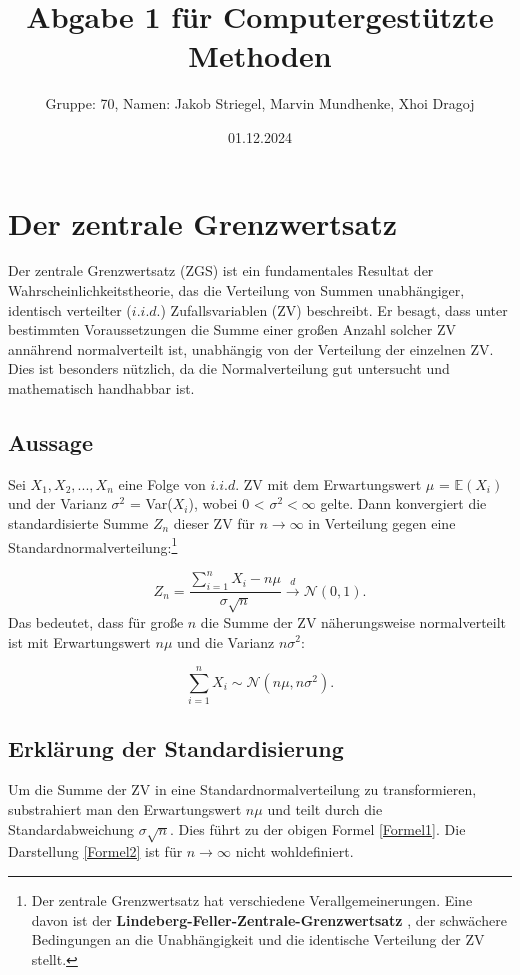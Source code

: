 \documentclass{article}
\title{Abgabe 1 für Computergestützte Methoden}
\author{Gruppe: 70, Namen: Jakob Striegel, Marvin Mundhenke, Xhoi Dragoj}
\date{01.12.2024}
\begin{document}
\maketitle
\tableofcontents
\newpage
\section{Der zentrale Grenzwertsatz}
Der zentrale Grenzwertsatz (ZGS) ist ein fundamentales Resultat der Wahrscheinlichkeitstheorie, das die Verteilung von Summen unabhängiger, identisch verteilter ($i.i.d.$) Zufallsvariablen (ZV) beschreibt. Er besagt, dass unter bestimmten Voraussetzungen die Summe einer großen Anzahl solcher ZV annährend normalverteilt ist, unabhängig von der Verteilung der einzelnen ZV. Dies ist besonders nützlich, da die Normalverteilung gut untersucht und mathematisch handhabbar ist.



\subsection{Aussage}
Sei $ X_{1} ,X_{2},..., X_{n} $ eine Folge von $i.i.d.$ ZV mit dem Erwartungswert $\mu$  = $\mathbb{E}(X_{i})$ 
und der Varianz $\sigma^2$ = Var($X_{i}$), wobei  0 < $\sigma^2 < \infty$ gelte. Dann konvergiert
die standardisierte Summe $Z_{n}$  dieser ZV für $n \to  \infty$  in Verteilung gegen eine
Standardnormalverteilung:\footnote[1]{Der zentrale Grenzwertsatz hat verschiedene Verallgemeinerungen. Eine davon ist der \textbf{Lindeberg-Feller-Zentrale-Grenzwertsatz} \citep[Seite 328]{klenke}, der schwächere Bedingungen an die Unabhängigkeit und die identische Verteilung der ZV stellt.}

\begin{equation}
    \label{Formel1}
    Z_{n}= \frac{\sum_{i=1}^{n} X_{i}-n\mu}{\sigma \sqrt{n}} \overset{d}{\to} \mathcal{N}(0,1).
\end{equation}
Das bedeutet, dass für große $n$ die Summe der ZV näherungsweise normalverteilt ist mit Erwartungswert $n\mu$ und die Varianz $n\sigma^2$:

\begin{equation}
    \label{Formel2}
    \sum_{i=1}^{n} X_{i} \sim \mathcal{N}(n\mu,n\sigma^2).
\end{equation}



\subsection{Erklärung der Standardisierung}
Um die Summe der ZV in eine Standardnormalverteilung zu transformieren, substrahiert man den Erwartungswert $n\mu$ und teilt durch die Standardabweichung $\sigma\sqrt{n}$. Dies führt zu der obigen Formel \eqref{Formel1}. Die Darstellung \eqref{Formel2} ist für $n \to \infty$ nicht wohldefiniert.
\end{document}
